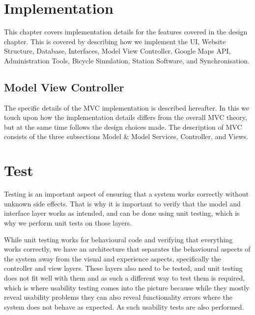 	\chapter{Implementation}
	This chapter covers implementation details for the features covered in the design chapter.
	This is covered by describing how we implement the UI, Website Structure, Database, Interfaces, Model View Controller, Google Maps API, Administration Tools, Bicycle Simulation, Station Software, and Synchronisation.
	 
	
	
	
	
	\section{Model View Controller}
	The specific details of the MVC implementation is described hereafter. In this we touch upon how the implementation details differs from the overall MVC theory, but at the same time follows the design choices made. The description of MVC consists of the three subsections Model \& Model Services, Controller, and Views.
	
	
	
	
	
	
	
	
	
	\chapter{Test}
	Testing is an important aspect of ensuring that a system works correctly without unknown side effects.
	That is why it is important to verify that the model and interface layer works as intended, and can be done using unit testing, which is why we perform unit tests on those layers.
	
	While unit testing works for behavioural code and verifying that everything works correctly, we have an architecture that separates the behavioural aspects of the system away from the visual and experience aspects, specifically the controller and view layers.
	These layers also need to be tested, and unit testing does not fit well with them and as such a different way to test them is required, which is where usability testing comes into the picture because while they mostly reveal usability problems they can also reveal functionality errors where the system does not behave as expected. 
	As such usability tests are also performed.
	
	
	
